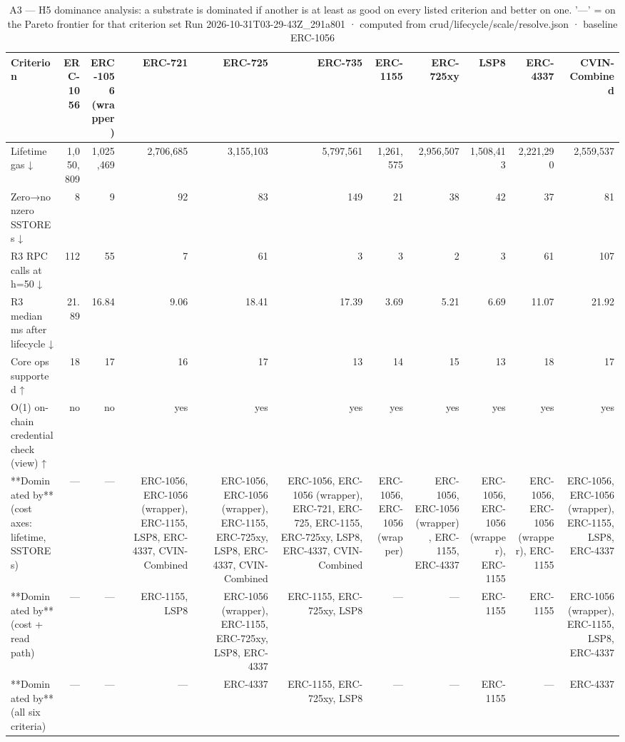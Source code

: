 \begin{table}[ht]
\centering
\small
\begin{tabular}{lrrrrrrrrrr}
\toprule
Criterion & ERC-1056 & ERC-1056 (wrapper) & ERC-721 & ERC-725 & ERC-735 & ERC-1155 & ERC-725xy & LSP8 & ERC-4337 & CVIN-Combined \\
\midrule
Lifetime gas ↓ & 1,050,809 & 1,025,469 & 2,706,685 & 3,155,103 & 5,797,561 & 1,261,575 & 2,956,507 & 1,508,413 & 2,221,290 & 2,559,537 \\
Zero→nonzero SSTOREs ↓ & 8 & 9 & 92 & 83 & 149 & 21 & 38 & 42 & 37 & 81 \\
R3 RPC calls at h=50 ↓ & 112 & 55 & 7 & 61 & 3 & 3 & 2 & 3 & 61 & 107 \\
R3 median ms after lifecycle ↓ & 21.89 & 16.84 & 9.06 & 18.41 & 17.39 & 3.69 & 5.21 & 6.69 & 11.07 & 21.92 \\
Core ops supported ↑ & 18 & 17 & 16 & 17 & 13 & 14 & 15 & 13 & 18 & 17 \\
O(1) on-chain credential check (view) ↑ & no & no & yes & yes & yes & yes & yes & yes & yes & yes \\
**Dominated by** (cost axes: lifetime, SSTOREs) & — & — & ERC-1056, ERC-1056 (wrapper), ERC-1155, LSP8, ERC-4337, CVIN-Combined & ERC-1056, ERC-1056 (wrapper), ERC-1155, ERC-725xy, LSP8, ERC-4337, CVIN-Combined & ERC-1056, ERC-1056 (wrapper), ERC-721, ERC-725, ERC-1155, ERC-725xy, LSP8, ERC-4337, CVIN-Combined & ERC-1056, ERC-1056 (wrapper) & ERC-1056, ERC-1056 (wrapper), ERC-1155, ERC-4337 & ERC-1056, ERC-1056 (wrapper), ERC-1155 & ERC-1056, ERC-1056 (wrapper), ERC-1155 & ERC-1056, ERC-1056 (wrapper), ERC-1155, LSP8, ERC-4337 \\
**Dominated by** (cost + read path) & — & — & ERC-1155, LSP8 & ERC-1056 (wrapper), ERC-1155, ERC-725xy, LSP8, ERC-4337 & ERC-1155, ERC-725xy, LSP8 & — & — & ERC-1155 & ERC-1155 & ERC-1056 (wrapper), ERC-1155, LSP8, ERC-4337 \\
**Dominated by** (all six criteria) & — & — & — & ERC-4337 & ERC-1155, ERC-725xy, LSP8 & — & — & ERC-1155 & — & ERC-4337 \\
\bottomrule
\end{tabular}
\caption{A3 — H5 dominance analysis: a substrate is dominated if another is at least as good on every listed criterion and better on one. '—' = on the Pareto frontier for that criterion set Run 2026-10-31T03-29-43Z\_291a801 · computed from crud/lifecycle/scale/resolve.json · baseline ERC-1056}
\label{tab:analysis_pareto}
\end{table}
